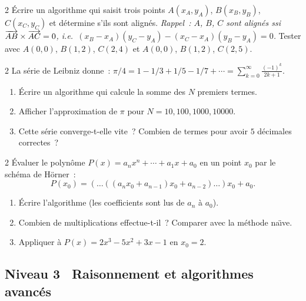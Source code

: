 \begin{exo}{2}
\'Ecrire un algorithme qui saisit trois points $A(x_A,y_A)$,
$B(x_B,y_B)$, $C(x_C,y_C)$ et d\'etermine s'ils sont align\'es.
\emph{Rappel~: $A$, $B$, $C$ sont align\'es ssi
$\overrightarrow{AB}\times\overrightarrow{AC}=0$, i.e.\
$(x_B-x_A)(y_C-y_A)-(x_C-x_A)(y_B-y_A)=0$.}
Tester avec $A(0,0)$, $B(1,2)$, $C(2,4)$ et $A(0,0)$, $B(1,2)$, $C(2,5)$.
\end{exo}

\begin{exo}{2}
La s\'erie de Leibniz donne~:
$\pi/4 = 1 - 1/3 + 1/5 - 1/7 + \cdots = \displaystyle\sum_{k=0}^{\infty}\frac{(-1)^k}{2k+1}$.
\begin{enumerate}
  \item \'Ecrire un algorithme qui calcule la somme des $N$ premiers termes.
  \item Afficher l'approximation de $\pi$ pour $N = 10, 100, 1000, 10000$.
  \item Cette s\'erie converge-t-elle vite~? Combien de termes pour avoir
        $5$ d\'ecimales correctes~?
\end{enumerate}
\end{exo}

\begin{exo}{2}
\'Evaluer le polyn\^ome $P(x) = a_n x^n + \cdots + a_1 x + a_0$ en un
point $x_0$ par le sch\'ema de H\"orner~:
\[ P(x_0) = (\ldots((a_n x_0 + a_{n-1})x_0 + a_{n-2})\ldots)x_0 + a_0. \]
\begin{enumerate}
  \item \'Ecrire l'algorithme (les coefficients sont lus de $a_n$ \`a $a_0$).
  \item Combien de multiplications effectue-t-il~? Comparer avec
        la m\'ethode na\"\i ve.
  \item Appliquer \`a $P(x) = 2x^3 - 5x^2 + 3x - 1$ en $x_0 = 2$.
\end{enumerate}
\end{exo}

\subsection*{\diff{3}\quad Niveau 3 \textemdash\ Raisonnement et algorithmes avanc\'es}

